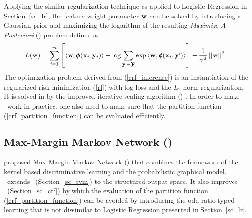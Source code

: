 {Applying the similar regularization technique as applied to Logistic Regression in Section~\ref{sc_lr}, the feature weight parameter $\mathbf {w}$ can be solved by introducing a Gaussian prior and maximizing the logarithm of the resulting \textit{Maximize A-Posteriori} (\map) problem \citep{taskar02} defined as
\begin{align}
	L(\mathbf {w}) = \sum_{i=1}^{m}\left[\langle \mathbf {w}, \pmb \phi(\mathbf {x}_i,\mathbf {y}_i) \rangle-\log{\sum_{\mathbf {y}'\in\pmb {\mathcal{Y}}}{\exp{\langle \mathbf {w}, \pmb \phi(\mathbf {x}_i,\mathbf {y}') \rangle}}}\right] - \frac{1}{\sigma^2}\left|\left| \mathbf {w} \right|\right|^2. \label{crf_inference}
\end{align}
The optimization problem derived from (\ref{crf_inference}) is an instantiation of the regularized risk minimization (\ref{rl}) with log-loss and the $L_2$-norm regularization.
It is solved in \citep{lafferty01} by the improved iterative scaling algorithm (\iis) \citep{Pietra97inducing}.
In order to make \crf\ work in practice, one also need to make sure that the partition function (\ref{crf_partition_function}) can be evaluated efficiently.



%
% 
\subsection{Max-Margin Markov Network (\mmmn)} \label{sc_mmmn}

\citet{Taskar04max} proposed Max-Margin Markov Network (\mmmn) that combines the framework of the kernel based discriminative learning and the probabilistic graphical model.
\mmmn\ extends \svm\ (Section~\ref{sc_svm}) to the structured output space.
It also improves \crf\ (Section~\ref{sc_crf}) by which the evaluation of the partition function (\ref{crf_partition_function}) can be avoided by introducing the odd-ratio typed learning that is not dissimilar to Logistic Regression presented in Section~\ref{sc_lr}.

}
